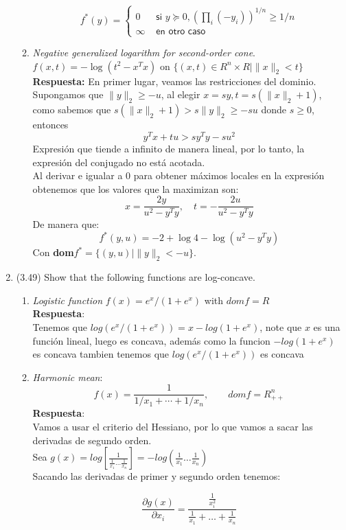 \documentclass[12pt, oneside]{article}%
\begin{document}
\begin{enumerate}
\begin{enumerate}
    $$f^*(y)=\begin{cases}
    0 & \textsf{ si } y\succeq 0, (\prod_i(-y_i))^{1/n}\geq1/n\\
    \infty& \textsf{ en otro caso}
    \end{cases}$$
    \item \textit{Negative generalized logarithm for second-order cone}. $f(x,t) = -\log(t^2 - x^Tx)$ on $\{(x,t) \in R^n \times R | \|x\|_2 < t\}$
    \textbf{Respuesta:}
    En primer lugar, veamos las restricciones del dominio. Supongamos que $\|y\|_2\geq -u$, al elegir $x=sy, t=s(\|x\|_2+1)$, como sabemos que $s(\|x\|_2+1)>s\|y\|_2\geq -su$ donde $s\geq 0$, entonces
    $$y^Tx+tu > sy^Ty-su^2$$
    Expresión que tiende a infinito de manera lineal, por lo tanto, la expresión del conjugado no está acotada.\\
    Al derivar e igualar a 0 para obtener máximos locales en la expresión obtenemos que los valores que la maximizan son:
    $$x=\frac{2y}{u^2-y^Ty},\quad t=-\frac{2u}{u^2-y^Ty}$$
    De manera que:
    $$f^*(y,u)=-2+\log 4-\log(u^2-y^Ty)$$
    Con \textbf{dom}$f^*=\{(y,u)|\|y\|_2<-u\}$.
\end{enumerate}

\item (3.49) Show that the following functions are log-concave.\\
\begin{enumerate}
    \item \textit{Logistic function} $f(x) = e^x/(1+e^x)$ with $dom f = R$ \\
     \textbf{Respuesta}: \\
     Tenemos que $log(e^x/(1+e^x)) = x - log(1 + e^x)$, note que $x$ es una función lineal, luego es concava, además como la funcion $- log(1 + e^x)$ es concava tambien tenemos que $log(e^x/(1+e^x))$ es concava 
     
    \item \textit{Harmonic mean}:
    $$f(x) = \frac{1}{1/x_1 + \cdots + 1/x_n}, \qquad dom f = R_{++}^n$$
     \textbf{Respuesta}: \\
     Vamos a usar el criterio del Hessiano, por lo que vamos a sacar las derivadas de segundo orden.\\
     Sea $g(x) = log \left[\frac{1}{\frac{1}{x_1} \dots \frac{1}{x_n} } \right] = -log(\frac{1}{x_1} \dots \frac{1}{x_n})$\\ 
     Sacando las derivadas de primer y segundo orden tenemos: 
     
     $$\frac{\partial g(x)}{\partial x_i} = \frac{\frac{1}{x_i^2}}{\frac{1}{x_1} + \dots + \frac{1}{x_n}}$$
     

\end{enumerate}
\end{enumerate}
\end{document}
